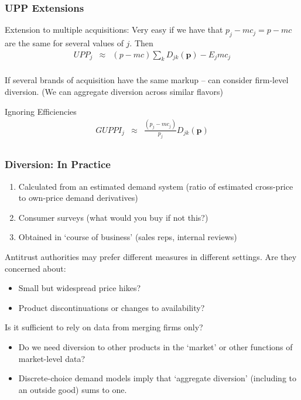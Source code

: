 \documentclass[xcolor=pdftex,dvipsnames,table,mathserif,aspectratio=169]{beamer}
\begin{document}
\begin{frame}
\frametitle{UPP Extensions}
\begin{block}{Extension to multiple acquisitions:}
Very easy if we have that $p_j - mc_j = p - mc$ are the same for several values of $j$.  Then
\begin{eqnarray*}
UPP_j &\approx& (p - mc) \sum_k D_{jk}(\mathbf{p}) -  E_j mc_j \\
\end{eqnarray*}
\end{block}
If several brands of acquisition have the same markup -- can consider firm-level diversion. (We can aggregate diversion across similar flavors)
\begin{block}{Ignoring Efficiencies}
\begin{eqnarray*}
GUPPI_j &\approx& \frac{(p_j - mc_j)}{p_j} D_{jk}(\mathbf{p}) \\
\end{eqnarray*}
\end{block}

\end{frame}



\begin{frame}
\frametitle{Diversion: In Practice}
\footnotesize
\begin{enumerate}
\item Calculated from an estimated demand system (ratio of estimated cross-price to own-price demand derivatives)
\item Consumer surveys (what would you buy if not this?)
\item Obtained in `course of business' (sales reps, internal reviews)
\end{enumerate}
Antitrust authorities may prefer different measures in different settings. Are they concerned about:
\begin{itemize}
\item Small but widespread price hikes?
\item Product discontinuations or changes to availability?
\end{itemize}
Is it sufficient to rely on data from merging firms only?
\begin{itemize}
\item Do we need diversion to other products in the `market' or other functions of market-level data?
\item Discrete-choice demand models imply that `aggregate diversion' (including to an outside good) sums to one.
\end{itemize}
\end{frame}
\end{document}
